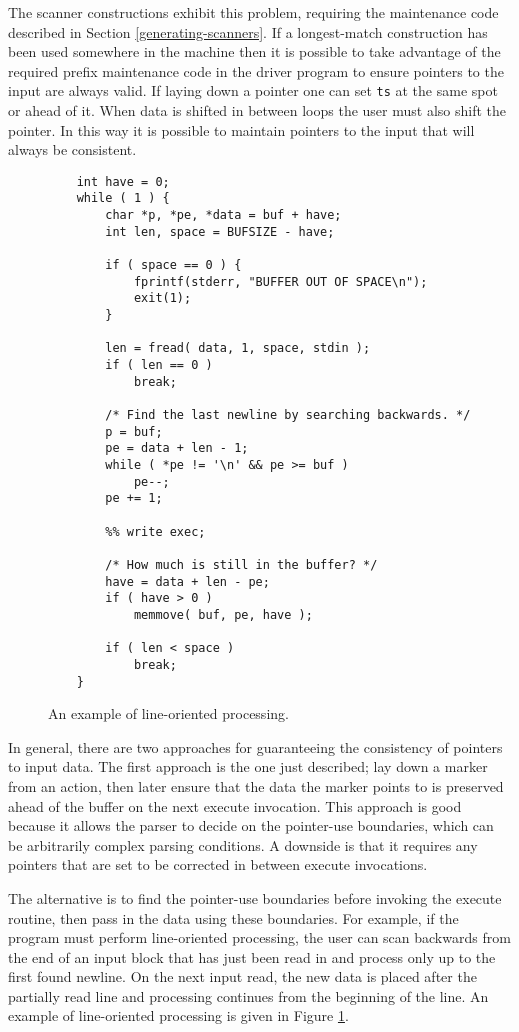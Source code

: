 \documentclass[letterpaper,11pt,oneside]{book}
\newcommand{\verbspace}{\vspace{10pt}}
\begin{document}
The scanner constructions exhibit this problem, requiring the maintenance
code described in Section \ref{generating-scanners}. If a longest-match
construction has been used somewhere in the machine then it is possible to
take advantage of the required prefix maintenance code in the driver program to
ensure pointers to the input are always valid. If laying down a pointer one can
set \verb|ts| at the same spot or ahead of it. When data is shifted in
between loops the user must also shift the pointer.  In this way it is possible
to maintain pointers to the input that will always be consistent.

\begin{figure}
\small
\begin{verbatim}
    int have = 0;
    while ( 1 ) {
        char *p, *pe, *data = buf + have;
        int len, space = BUFSIZE - have;

        if ( space == 0 ) { 
            fprintf(stderr, "BUFFER OUT OF SPACE\n");
            exit(1);
        }

        len = fread( data, 1, space, stdin );
        if ( len == 0 )
            break;

        /* Find the last newline by searching backwards. */
        p = buf;
        pe = data + len - 1;
        while ( *pe != '\n' && pe >= buf )
            pe--;
        pe += 1;

        %% write exec;

        /* How much is still in the buffer? */
        have = data + len - pe;
        if ( have > 0 )
            memmove( buf, pe, have );

        if ( len < space )
            break;
    }
\end{verbatim}
\verbspace
\caption{An example of line-oriented processing.
}
\label{line-oriented}
\end{figure}

In general, there are two approaches for guaranteeing the consistency of
pointers to input data. The first approach is the one just described;
lay down a marker from an action,
then later ensure that the data the marker points to is preserved ahead of
the buffer on the next execute invocation. This approach is good because it
allows the parser to decide on the pointer-use boundaries, which can be
arbitrarily complex parsing conditions. A downside is that it requires any
pointers that are set to be corrected in between execute invocations.

The alternative is to find the pointer-use boundaries before invoking the execute
routine, then pass in the data using these boundaries. For example, if the
program must perform line-oriented processing, the user can scan backwards from
the end of an input block that has just been read in and process only up to the
first found newline. On the next input read, the new data is placed after the
partially read line and processing continues from the beginning of the line.
An example of line-oriented processing is given in Figure \ref{line-oriented}.
\end{document}
